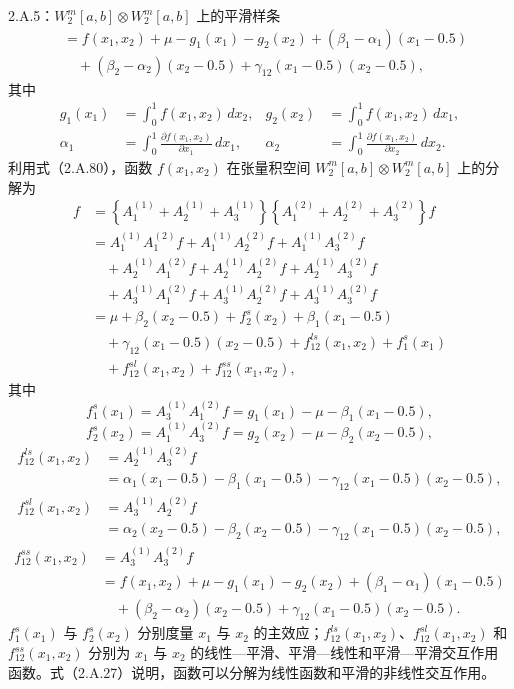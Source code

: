 \begin{bookexample}{2.A.5：$W_2^m[a,b]\otimes W_2^m[a,b]$ 上的平滑样条}
\[\begin{aligned}
 &=f(x_1,x_2)+\mu-g_1(x_1)-g_2(x_2)
   +(\beta_1-\alpha_1)(x_1-0.5)\\
 &\quad+(\beta_2-\alpha_2)(x_2-0.5)
   +\gamma_{12}(x_1-0.5)(x_2-0.5),
\end{aligned}
\]
其中
\[
\begin{aligned}
g_1(x_1)&=\int_0^1f(x_1,x_2)\,dx_2,&
g_2(x_2)&=\int_0^1f(x_1,x_2)\,dx_1,\\
\alpha_1&=\int_0^1\frac{\partial f(x_1,x_2)}{\partial x_1}\,dx_1,&
\alpha_2&=\int_0^1\frac{\partial f(x_1,x_2)}{\partial x_2}\,dx_2.
\end{aligned}
\]
利用式（2.A.80），函数 $f(x_1,x_2)$ 在张量积空间 $W_2^m[a,b]\otimes W_2^m[a,b]$ 上的分解为
\[
\begin{aligned}
f&=\left\{A_1^{(1)}+A_2^{(1)}+A_3^{(1)}\right\}
   \left\{A_1^{(2)}+A_2^{(2)}+A_3^{(2)}\right\}f\\
 &=A_1^{(1)}A_1^{(2)}f+A_1^{(1)}A_2^{(2)}f+A_1^{(1)}A_3^{(2)}f\\
 &\quad+A_2^{(1)}A_1^{(2)}f+A_2^{(1)}A_2^{(2)}f+A_2^{(1)}A_3^{(2)}f\\
 &\quad+A_3^{(1)}A_1^{(2)}f+A_3^{(1)}A_2^{(2)}f+A_3^{(1)}A_3^{(2)}f\\
 &=\mu+\beta_2(x_2-0.5)+f_2^s(x_2)+\beta_1(x_1-0.5)\\
 &\quad+\gamma_{12}(x_1-0.5)(x_2-0.5)
   +f_{12}^{ls}(x_1,x_2)+f_1^s(x_1)\\
 &\quad+f_{12}^{sl}(x_1,x_2)+f_{12}^{ss}(x_1,x_2),
\end{aligned}
\]
其中
\[
f_1^s(x_1)=A_3^{(1)}A_1^{(2)}f
 =g_1(x_1)-\mu-\beta_1(x_1-0.5),
\]
\[
f_2^s(x_2)=A_1^{(1)}A_3^{(2)}f
 =g_2(x_2)-\mu-\beta_2(x_2-0.5),
\]
\[
\begin{aligned}
f_{12}^{ls}(x_1,x_2)&=A_2^{(1)}A_3^{(2)}f\\
 &=\alpha_1(x_1-0.5)-\beta_1(x_1-0.5)
   -\gamma_{12}(x_1-0.5)(x_2-0.5),
\end{aligned}
\]
\[
\begin{aligned}
f_{12}^{sl}(x_1,x_2)&=A_3^{(1)}A_2^{(2)}f\\
 &=\alpha_2(x_2-0.5)-\beta_2(x_2-0.5)
   -\gamma_{12}(x_1-0.5)(x_2-0.5),
\end{aligned}
\]
\[
\begin{aligned}
f_{12}^{ss}(x_1,x_2)&=A_3^{(1)}A_3^{(2)}f\\
 &=f(x_1,x_2)+\mu-g_1(x_1)-g_2(x_2)
   +(\beta_1-\alpha_1)(x_1-0.5)\\
 &\quad+(\beta_2-\alpha_2)(x_2-0.5)
   +\gamma_{12}(x_1-0.5)(x_2-0.5).
\end{aligned}
\]
$f_1^s(x_1)$ 与 $f_2^s(x_2)$ 分别度量 $x_1$ 与 $x_2$ 的主效应；$f_{12}^{ls}(x_1,x_2)$、$f_{12}^{sl}(x_1,x_2)$ 和 $f_{12}^{ss}(x_1,x_2)$ 分别为 $x_1$ 与 $x_2$ 的线性—平滑、平滑—线性和平滑—平滑交互作用函数。式（2.A.27）说明，函数可以分解为线性函数和平滑的非线性交互作用。


\end{bookexample}
